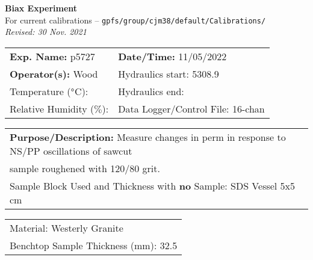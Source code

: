 \documentclass[letterpaper, 10pt]{article}
\begin{document}
\begin{center}
    {\Large \textbf{Biax Experiment}}\\
    {\small For current calibrations -- \texttt{gpfs/group/cjm38/default/Calibrations/}}\\
    {\footnotesize \textit{Revised: 30 Nov. 2021}}
\end{center}



\begin{table}[!ht]
	\renewcommand{\arraystretch}{1.1}
	\begin{tabular}{p{10cm} p{10cm} }
	    \textbf{Exp. Name: }p5727 & \textbf{Date/Time: }11/05/2022\\
	    \textbf{Operator(s): }Wood & Hydraulics start: 5308.9 \\
	    Temperature ($\degree$C):  & Hydraulics end:  \\
	    Relative Humidity ($\%$):  & Data Logger/Control File: 16-chan \\
	\end{tabular}
\end{table} 
\vspace{-0.5cm} 

\begin{table}[!ht]
	\renewcommand{\arraystretch}{1.1}
	\begin{tabular}{p{20cm}}\textbf{Purpose/Description:} Measure changes in perm in response to NS/PP oscillations of sawcut \\sample roughened with 120/80 grit.  \\Sample Block Used and Thickness with \textbf{no} Sample: SDS Vessel 5x5 cm \\
	\end{tabular}
    \end{table} \vspace{-0.5cm} 

\begin{table}[!ht]
        \small
        \renewcommand{\arraystretch}{1.2}
        \begin{tabular}{ |p{7cm}| } \hline 
Material: Westerly Granite \\Benchtop Sample Thickness (mm): 32.5 \\ \hline \end{tabular} \end{table} \vspace{-0.5cm} 
\end{document}
